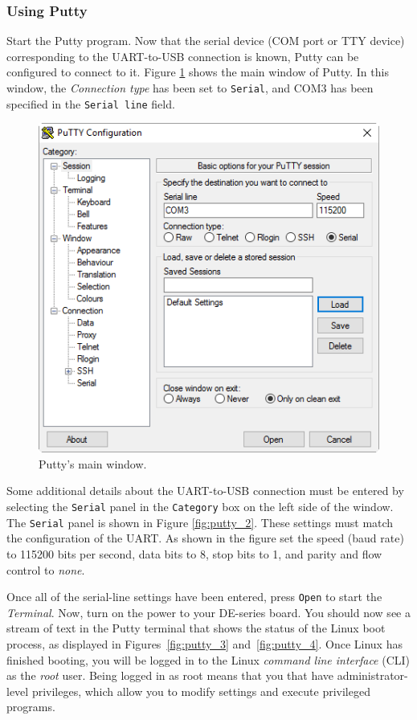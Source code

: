 \documentclass[11pt, twoside, pdftex]{article}
\begin{document}
\subsubsection{Using Putty}

Start the Putty program. Now that the serial device (COM port or TTY device) corresponding to the 
UART-to-USB connection is known, Putty can be configured to connect to it. 
Figure \ref{fig:putty_1} shows the
main window of Putty. In this window, the {\it Connection type} has been set to
\texttt{Serial}, and 
COM3 has been specified in the \texttt{Serial line} field. 

\begin{figure}[H]
   \begin{center}
       \includegraphics[scale=0.7]{figures/fig_putty_tut_1}
   \end{center}
   \caption{Putty's main window.}
	\label{fig:putty_1}
\end{figure}

Some additional details about the UART-to-USB connection must be entered by selecting the 
\texttt{Serial} panel in the \texttt{Category} box on the left side of the window. The
\texttt{Serial}
panel is shown in Figure \ref{fig:putty_2}. These settings must match the configuration of the 
UART. As shown in the figure set the speed (baud rate) to 115200 bits per second, data
bits to 8, stop bits to 1, and parity and flow control to \textit{none}. 

Once all of the serial-line settings have been entered, press \texttt{Open} to start the
{\it Terminal}. Now, turn on the power to your DE-series board. You should now see a stream 
of text in the Putty terminal that shows the status of the Linux boot process, as displayed in 
Figures~\ref{fig:putty_3} and~\ref{fig:putty_4}. Once Linux has finished booting, you will be 
logged in to the Linux {\it command line interface} (CLI) as the \textit{root} user. Being logged 
in as root means that you that have administrator-level privileges, which allow you to modify 
settings and execute privileged programs.
\end{document}

